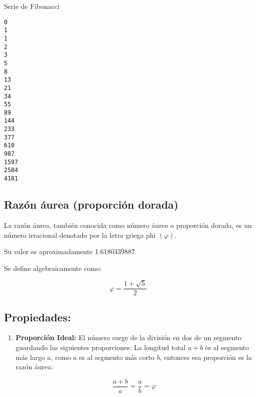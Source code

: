 \begin{code} Serie de Fibonacci
\begin{Shaded}
\begin{Highlighting}[]

    \OperatorTok{==} \OperatorTok{==}\NormalTok{:}
    \NormalTok{: }
        \OperatorTok{{-}}\NormalTok{) }\OperatorTok{+}\OperatorTok{{-}}\NormalTok{)}

 \NormalTok{(}\NormalTok{):}
\end{Highlighting}
\end{Shaded}

\begin{verbatim}
0
1
1
2
3
5
8
13
21
34
55
89
144
233
377
610
987
1597
2584
4181
\end{verbatim}
\end{code}

\subsection{Razón áurea (proporción dorada)}

La razón áurea, también conocida como número áureo o proporción dorada,
es un número irracional denotado por la letra griega phi \((\varphi)\).

Su valor es aproximadamente 1.6180339887.

Se define algebraicamente como:

\[ \varphi = \frac{1 + \sqrt{5}}{2} \]

\subsection{Propiedades:}\label{propiedades}

\begin{enumerate}
\item
  \textbf{Proporción Ideal:} El número surge de la división en dos de un
  segmento guardando las siguientes proporciones: La longitud total
  \(a+b\) es al segmento más largo \(a\), como \(a\) es al segmento más
  corto \(b\), entonces esa proporción es la razón áurea:

  \[ \frac{a+b}{a} = \frac{a}{b} = \varphi \]
\end{enumerate}

